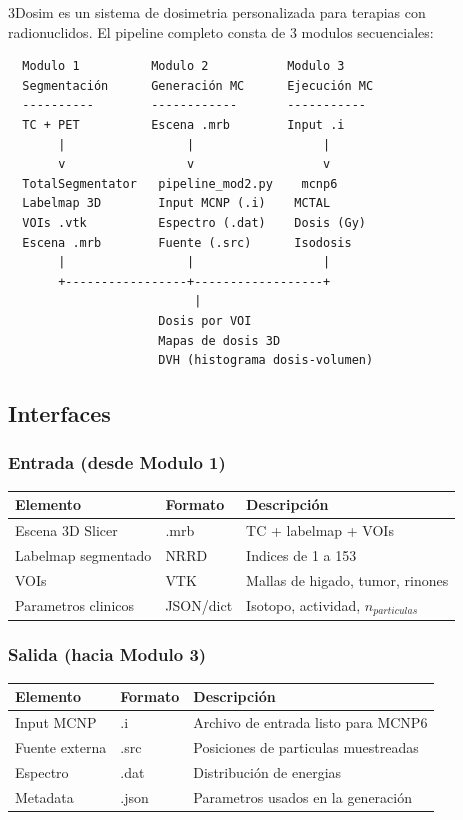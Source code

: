\documentclass[12pt,a4paper]{article}
\begin{document}
3Dosim es un sistema de dosimetria personalizada para terapias con radionuclidos. El pipeline completo consta de 3 modulos secuenciales:

\begin{lstlisting}
  Modulo 1          Modulo 2           Modulo 3
  Segmentación      Generación MC      Ejecución MC
  ----------        ------------       -----------
  TC + PET          Escena .mrb        Input .i
       |                 |                  |
       v                 v                  v
  TotalSegmentator   pipeline_mod2.py    mcnp6
  Labelmap 3D        Input MCNP (.i)    MCTAL
  VOIs .vtk          Espectro (.dat)    Dosis (Gy)
  Escena .mrb        Fuente (.src)      Isodosis
       |                 |                  |
       +-----------------+------------------+
                          |
                     Dosis por VOI
                     Mapas de dosis 3D
                     DVH (histograma dosis-volumen)
\end{lstlisting}

\subsection{Interfaces}

\subsubsection{Entrada (desde Modulo 1)}

\begin{center}
\begin{tabular}{lll}
\toprule
\textbf{Elemento} & \textbf{Formato} & \textbf{Descripción} \\
\midrule
Escena 3D Slicer & .mrb & TC + labelmap + VOIs \\
Labelmap segmentado & NRRD & Indices de 1 a 153 \\
VOIs & VTK & Mallas de higado, tumor, rinones \\
Parametros clinicos & JSON/dict & Isotopo, actividad, $n_{particulas}$ \\
\bottomrule
\end{tabular}
\end{center}

\subsubsection{Salida (hacia Modulo 3)}

\begin{center}
\begin{tabular}{lll}
\toprule
\textbf{Elemento} & \textbf{Formato} & \textbf{Descripción} \\
\midrule
Input MCNP & .i & Archivo de entrada listo para MCNP6 \\
Fuente externa & .src & Posiciones de particulas muestreadas \\
Espectro & .dat & Distribución de energias \\
Metadata & .json & Parametros usados en la generación \\
\bottomrule
\end{tabular}
\end{center}
\end{document}
